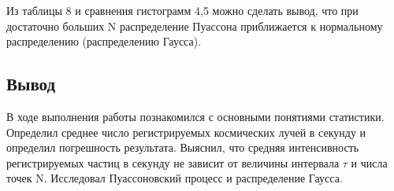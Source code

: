 \documentclass[a4paper]{article}
\begin{document}
Из таблицы 8 и сравнения гистограмм 4,5 можно сделать вывод, что при достаточно больших N распределение Пуассона приближается к нормальному распределению (распределению Гаусса).

\subsection{Вывод}
В ходе выполнения работы познакомился с основными понятиями статистики. Определил среднее число регистрируемых космических лучей в секунду и определил погрешность результата. Выяснил, что средняя интенсивность регистрируемых частиц в секунду не зависит от величины интервала $\tau$ и числа точек N. Исследовал Пуассоновский процесс и распределение Гаусса.\par



\newpage
\end{document}
